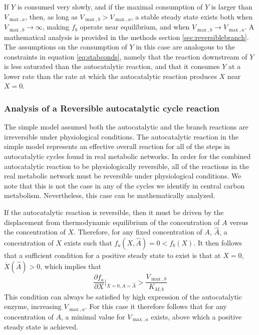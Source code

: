     If $Y$ is consumed very slowly, and if the maximal consumption of $Y$ is larger than $V_{\max,a}$, then, as long as $V_{\max,b}>V_{\max,a}$, a stable steady state exists both when  $V_{\max,b}\rightarrow\infty$, making $f_b$ operate near equilibrium, and when $V_{\max,b}\rightarrow V_{\max,a}$.
    A mathematical analysis is provided in the methods section \ref{sec:reversiblebranch}.
    The assumptions on the consumption of $Y$ in this case are analogous to the constraints in equation \ref{eq:stabconds}, namely that the reaction downstream of $Y$ is less saturated than the autocatalytic reaction, and that it consumes $Y$ at a lower rate than the rate at which the autocatalytic reaction produces $X$ near $X=0$.


    \subsubsection{Analysis of a Reversible autocatalytic cycle reaction}
    The simple model assumed both the autocatalytic and the branch reactions are irreversible under physiological conditions.
    The autocatalytic reaction in the simple model represents an effective overall reaction for all of the steps in autocatalytic cycles found in real metabolic networks.
    In order for the combined autocatalytic reaction to be physiologically reversible, all of the reactions in the real metabolic network must be reversible under physiological conditions.
    We note that this is not the case in any of the cycles we identify in central carbon metabolism.
    Nevertheless, this case can be mathematically analyzed.

    If the autocatalytic reaction is reversible, then it must be driven by the displacement from thermodynamic equilibrium of the concentration of $A$ versus the concentration of $X$.
    Therefore, for any fixed concentration of $A$, $\hat{A}$, a concentration of $X$ exists such that $f_a(X,\hat{A})=0<f_b(X)$.
    It then follows that a sufficient condition for a positive steady state to exist is that at $X=0$, $\dot{X}(\hat{A})>0$, which implies that
    \begin{equation*}
        \frac{\partial f_a}{\partial X}\Big\vert_{X=0,A=\hat{A}}>\frac{V_{\max,b}}{K_{M,b}}
    \end{equation*}
    This condition can always be satisfied by high expression of the autocatalytic enzyme, increasing $V_{\max,a}$.
    For this case it therefore follows that for any concentration of $A$, a minimal value for $V_{\max,a}$ exists, above which a positive steady state is achieved.

